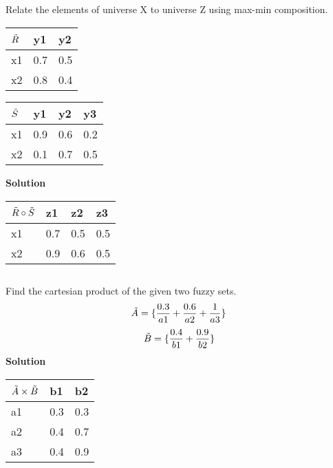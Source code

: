 \documentclass{article}
\begin{document}
{\subsection{}
Relate the elements of universe X to universe Z using max-min composition.
\begin{center}
\def\arraystretch{1.4}%
\begin{tabular}{ | m{1cm} | m{1cm}| m{1cm} | } 
  \hline
  $\Tilde{R}$ & y1 &y2  \\ 
  \hline
    x1& 0.7 &0.5  \\ 
  \hline
   x2&0.8  & 0.4 \\ 
  \hline
\end{tabular}
\quad
\def\arraystretch{1.4}%
\begin{tabular}{ | m{1cm} | m{1cm}| m{1cm} | m{1cm}| } 
  \hline
  $\Tilde{S}$ & y1 &y2 & y3  \\ 
  \hline
    x1& 0.9 &0.6 &0.2 \\ 
  \hline
   x2&0.1  & 0.7 & 0.5\\ 
  \hline
\end{tabular}
\end{center}
\textbf{Solution}\newline
\begin{center}
\def\arraystretch{1.4}%
\begin{tabular}{ | m{1cm} | m{1cm}| m{1cm} | m{1cm}| } 
  \hline
  $\Tilde{R}\circ\Tilde{S}$ & z1 &z2 & z3  \\ 
  \hline
    x1& 0.7 &0.5 &0.5 \\ 
  \hline
   x2&0.9  & 0.6 & 0.5\\ 
  \hline
\end{tabular}
\end{center}
\subsection{}
Find the cartesian product of the given two fuzzy sets.
\[\Tilde{A}=\{{\frac{0.3}{a1}+\frac{0.6}{a2}+\frac{1}{a3}}\}\]
\[\Tilde{B}=\{{\frac{0.4}{b1}+\frac{0.9}{b2}}\}\]
\textbf{Solution}\newline
\begin{center}
    \def\arraystretch{1.4}%
\begin{tabular}{  | m{1.2cm}| m{1.4cm} | m{1.1cm}| } 
  \hline
  $\Tilde{A}\times\Tilde{B}$ & b1 & b2 \\ 
  \hline
   a1 & 0.3 & 0.3 \\ 
  \hline
   a2 & 0.4 & 0.7\\ 
  \hline
   a3 & 0.4 & 0.9 \\ 
  \hline
\end{tabular}
\end{center}
}
\end{document}

